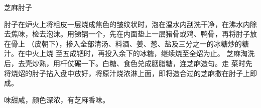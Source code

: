 \begin{recipe}{芝麻肘子}

\ingredients


\preparation

\step 肘子在炉火上将粗皮一层烧成焦色的皱纹状时，泡在温水内刮洗干净，在沸水内除
去焦味，检去泡沫。用锑锅一个，先在内面垫上一层猪骨或鸡、鸭骨，再将肘子放在骨上
（皮朝下），掺入全部清汤、料酒、姜、葱、盐及三分之一的冰糖炒的糖汁。在中火上烧
至五成钯时，再投入余下的冰糖，继续烧至全炤为止。
\step 芝麻淘洗后，去壳炒熟，用杆仗碾一下。白糖、食色兑成胭脂糖，连芝麻造匀。走
菜时先将烧炤的肘子拈入盘中放好，将原汁烧浓淋上面，即将造合过的芝麻撒在肘子上即
成。

\features

味甜咸，颜色深浓，有芝麻香味。

\end{recipe}

